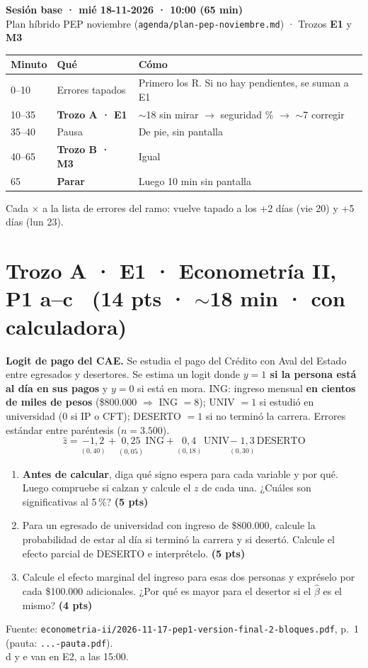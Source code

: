 \documentclass[11pt]{article}
\newcommand{\pts}[1]{\hfill\textbf{(#1 pts)}}
\newcommand{\seguridad}{\par\medskip\fbox{\parbox{0.96\linewidth}{\textbf{Seguridad:} \rule{1.5cm}{0.4pt}\,\%\quad \textbf{Inicio:} \rule{1.5cm}{0.4pt}\quad \textbf{Fin:} \rule{1.5cm}{0.4pt}\quad \textbf{Aciertos:} \rule{1.2cm}{0.4pt}}}\par}
\begin{document}
{\Large\textbf{Sesión base · mié 18-11-2026 · 10:00 (65 min)}}\\[2pt]
{\small Plan híbrido PEP noviembre (\texttt{agenda/plan-pep-noviembre.md}) · Trozos \textbf{E1} y \textbf{M3}}

\medskip
\begin{tabular}{@{}lll@{}}
\toprule
Minuto & Qué & Cómo \\ \midrule
0--10 & Errores tapados & Primero los R. Si no hay pendientes, se suman a E1 \\
10--35 & \textbf{Trozo A · E1} & $\sim$18 sin mirar $\to$ seguridad \% $\to$ $\sim$7 corregir \\
35--40 & Pausa & De pie, sin pantalla \\
40--65 & \textbf{Trozo B · M3} & Igual \\
65 & \textbf{Parar} & Luego 10 min sin pantalla \\ \bottomrule
\end{tabular}

\smallskip
{\small Cada \textbf{$\times$} a la lista de errores del ramo: vuelve tapado a los +2 días (vie 20) y +5 días (lun 23).}

\section*{Trozo A · E1 · Econometría II, P1 a--c \ {\normalsize\mdseries (14 pts · $\sim$18 min · con calculadora)}}

\textbf{Logit de pago del CAE.} Se estudia el pago del Crédito con Aval del Estado entre egresados y desertores. Se estima un logit donde \textbf{$y=1$ si la persona está al día en sus pagos} y $y=0$ si está en mora. ING: ingreso mensual \textbf{en cientos de miles de pesos} (\$800.000 $\Rightarrow$ ING $=8$); UNIV $=1$ si estudió en universidad (0 si IP o CFT); DESERTO $=1$ si no terminó la carrera. Errores estándar entre paréntesis ($n=3.500$).
\[
\hat z=\underset{(0{,}40)}{-1{,}2}+\underset{(0{,}05)}{0{,}25}\,\text{ING}+\underset{(0{,}18)}{0{,}4}\,\text{UNIV}\underset{(0{,}30)}{-\;1{,}3}\,\text{DESERTO}
\]
\begin{enumerate}[label=\alph*),leftmargin=*,itemsep=4pt]
\item \textbf{Antes de calcular}, diga qué signo espera para cada variable y por qué. Luego compruebe si calzan y calcule el $z$ de cada una. ¿Cuáles son significativas al 5\,\%? \pts{5}
\item Para un egresado de universidad con ingreso de \$800.000, calcule la probabilidad de estar al día si terminó la carrera y si desertó. Calcule el efecto parcial de DESERTO e interprételo. \pts{5}
\item Calcule el efecto marginal del ingreso para esas dos personas y expréselo por cada \$100.000 adicionales. ¿Por qué es mayor para el desertor si el $\hat\beta$ es el mismo? \pts{4}
\end{enumerate}
{\small Fuente: \texttt{econometria-ii/2026-11-17-pep1-version-final-2-bloques.pdf}, p.~1 (pauta: \texttt{...-pauta.pdf}).\\ d y e van en E2, a las 15:00.}
\seguridad
\end{document}
